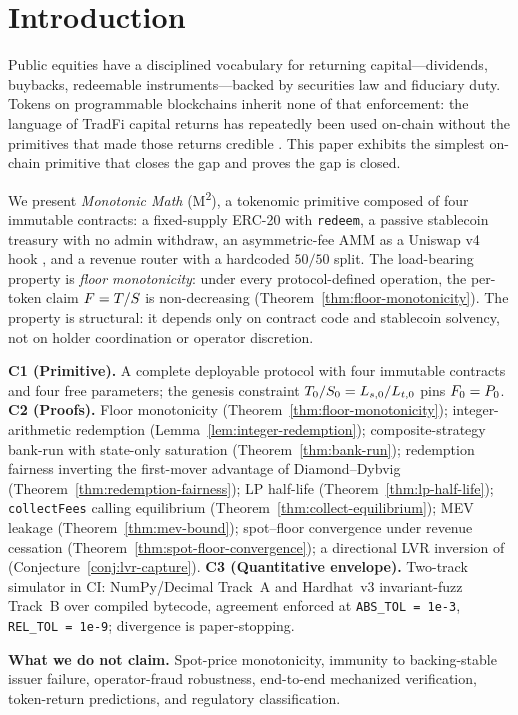\section{Introduction}
\label{sec:introduction}

Public equities have a disciplined vocabulary for returning capital---dividends, buybacks, redeemable instruments---backed by securities law and fiduciary duty. Tokens on programmable blockchains inherit none of that enforcement: the language of TradFi capital returns has repeatedly been used on-chain without the primitives that made those returns credible \citep{LiuMakarovSchoar2023,KlagesMundtMinca2021}. This paper exhibits the simplest on-chain primitive that closes the gap and proves the gap is closed.

We present \emph{Monotonic Math} (M\textsuperscript{2}), a tokenomic primitive composed of four immutable contracts: a fixed-supply ERC-20 with \texttt{redeem}, a passive stablecoin treasury with no admin withdraw, an asymmetric-fee AMM as a Uniswap v4 hook \citep{UniswapV4}, and a revenue router with a hardcoded $50/50$ split. The load-bearing property is \emph{floor monotonicity}: under every protocol-defined operation, the per-token claim $F = T/S$ is non-decreasing (Theorem~\ref{thm:floor-monotonicity}). The property is structural: it depends only on contract code and stablecoin solvency, not on holder coordination or operator discretion.

\textbf{C1 (Primitive).} A complete deployable protocol with four immutable contracts and four free parameters; the genesis constraint $T_0/S_0 = L_{s,0}/L_{t,0}$ pins $F_0 = P_0$. \textbf{C2 (Proofs).} Floor monotonicity (Theorem~\ref{thm:floor-monotonicity}); integer-arithmetic redemption (Lemma~\ref{lem:integer-redemption}); composite-strategy bank-run with state-only saturation (Theorem~\ref{thm:bank-run}); redemption fairness inverting the \citet{ChenGoldsteinJiang2010} first-mover advantage of Diamond--Dybvig \citep{DiamondDybvig1983} (Theorem~\ref{thm:redemption-fairness}); LP half-life (Theorem~\ref{thm:lp-half-life}); \texttt{collectFees} calling equilibrium (Theorem~\ref{thm:collect-equilibrium}); MEV leakage (Theorem~\ref{thm:mev-bound}); spot--floor convergence under revenue cessation (Theorem~\ref{thm:spot-floor-convergence}); a directional LVR inversion of \citet{MilionisMoallemiRoughgarden2023} (Conjecture~\ref{conj:lvr-capture}). \textbf{C3 (Quantitative envelope).} Two-track simulator in CI: NumPy/Decimal Track~A and Hardhat~v3 invariant-fuzz Track~B over compiled bytecode, agreement enforced at \texttt{ABS\_TOL = 1e-3}, \texttt{REL\_TOL = 1e-9}; divergence is paper-stopping.

\noindent\textbf{What we do not claim.} Spot-price monotonicity, immunity to backing-stable issuer failure, operator-fraud robustness, end-to-end mechanized verification, token-return predictions, and regulatory classification.
